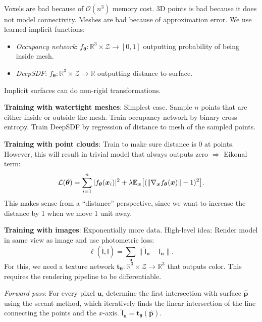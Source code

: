 \documentclass{article}
\newcommand{\lft}{\mathopen{}\mathclose\bgroup\left}
\newcommand{\rgt}{\aftergroup\egroup\right}
\newcommand{\E}{\mathbb{E}}
\newcommand{\R}{\mathbb{R}}
\renewcommand{\vec}[1]{\bm{#1}}
\newcommand{\tens}[1]{\bm{\mathsf{#1}}}
\newenvironment{topic}[1]
{\textbf{\sffamily \colorbox{black}{\rlap{\textbf{\textcolor{white}{#1}}}\hspace{\linewidth}\hspace{-2\fboxsep}}} \\ \vspace{0.2cm}}
{}
\begin{document}
\begin{multicols*}{2}
    \begin{topic}{Implicit surfaces and neural radiance fields}
        Voxels are bad because of $\mathcal{O}(n^3)$ memory cost. 3D points is bad because it does not
        model connectivity. Meshes are bad because of approximation error. We use learned implicit
        functions:
        \begin{itemize}
            \item \textit{Occupancy network}: $f_{\vec{\theta}}: \R^3 \times \mathcal{Z} \to [0,1]$ outputting probability of
                  being inside mesh.
            \item \textit{DeepSDF}: $f_{\vec{\theta}}: \R^3 \times \mathcal{Z} \to \R$ outputting distance to surface.
        \end{itemize}
        Implicit surfaces can do non-rigid transformations.

        \textbf{Training with watertight meshes}: Simplest case. Sample $n$ points that are either
        inside or outside the mesh. Train occupancy network by binary cross entropy. Train DeepSDF by
        regression of distance to mesh of the sampled points.

        \textbf{Training with point clouds}: Train to make sure distance is 0 at points. However, this will result in trivial model that always outputs zero $\Rightarrow$ Eikonal term: \[
            \mathcal{L}(\vec{\theta}) = \sum_{i=1}^{n} |f_{\vec{\theta}}(\vec{x}_i)|^2  + \lambda \E_{\vec{x}} \lft[ (\| \nabla_{\vec{x}} f_{\vec{\theta}}(\vec{x}) \| - 1)^2 \rgt].
        \]
        This makes sense from a ``distance'' perspective, since we want to increase the distance by 1 when
        we move 1 unit away.

        \textbf{Training with images}: Exponentially more data. High-level idea: Render model in same
        view as image and use photometric loss: \[
            \ell(\hat{\tens{I}}, \tens{I}) = \sum_{\vec{u}} \| \hat{\tens{I}}_{\vec{u}} - \tens{I}_{\vec{u}} \| .
        \]
        For this, we need a texture network $\vec{t}_{\vec{\theta}}: \R^3 \times \mathcal{Z} \to \R^3$ that
        outputs color. This requires the rendering pipeline to be differentiable.

        \textit{Forward pass}: For every pixel $\vec{u}$, determine the first intersection with surface
        $\hat{\vec{p}}$ using the secant method, which iteratively finds the linear intersection of the
        line connecting the points and the $x$-axis. $\hat{\tens{I}}_{\vec{u}} =
            \vec{t}_{\vec{\theta}}(\hat{\vec{p}})$.


\end{topic}
\end{multicols*}
\end{document}
